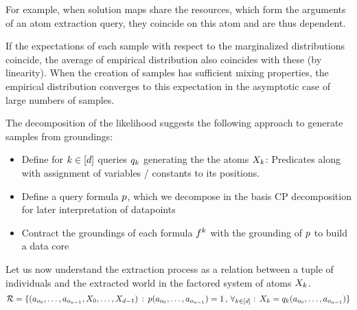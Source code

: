 %
For example, when solution maps share the resources, which form the arguments of an atom extraction query, they coincide on this atom and are thus dependent.

% 
If the expectations of each sample with respect to the marginalized distributions coincide, the average of empirical distribution also coincides with these (by linearity).
When the creation of samples has sufficient mixing properties, the empirical distribution converges to this expectation in the asymptotic case of large numbers of samples.

% 










The decomposition of the likelihood suggests the following approach to generate samples from groundings:
\begin{itemize}
	\item Define for $k\in[d]$ queries $q_{k}$ generating the the atoms $X_{k}$: 
	Predicates along with assignment of variables / constants to its positions.
	\item Define a query formula $p$, which we decompose in the basis CP decomposition for later interpretation of datapoints
	\item Contract the groundings of each formula $f^{k}$ with the grounding of $p$ to build a data core
\end{itemize}










Let us now understand the extraction process as a relation between a tuple of individuals and the extracted world in the factored system of atoms $X_{k}$.
	\[ \mathcal{R}
	= \{ (a_{o_{0}},\ldots,a_{o_{n-1}}, X_{0},\ldots,X_{d-1}) 
	\, : \,  p(a_{o_{0}},\ldots,a_{o_{n-1}}) = 1 \, , \, \forall_{k\in[d]} : \,  X_{k} = q_{k}(a_{o_{0}},\ldots,a_{o_{n-1}}) \}\]
	
